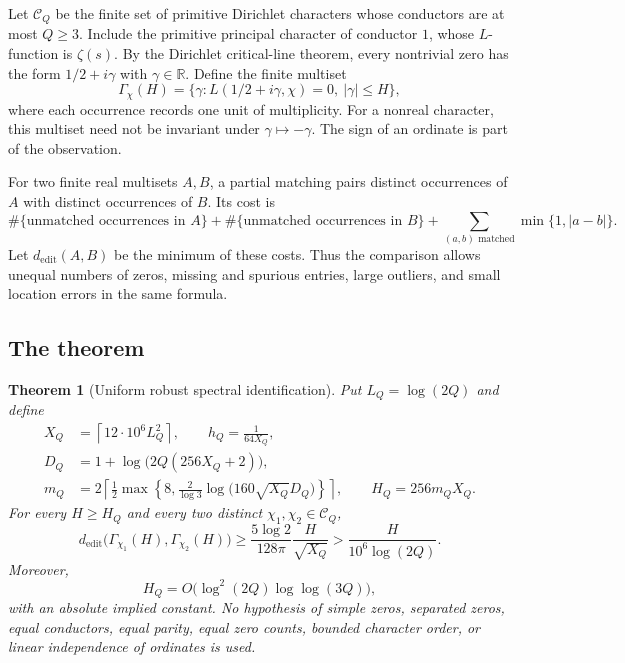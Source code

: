 \documentclass[11pt,letterpaper]{article}
\newtheorem{theorem}{Theorem}[section]
\theoremstyle{definition}\newtheorem{definition}[theorem]{Definition}
\theoremstyle{remark}\newtheorem{remark}[theorem]{Remark}
\newcommand{\edit}{d_{\mathrm{edit}}}
\newcommand{\Ccal}{\mathcal C}
\begin{document}
Let $\Ccal_Q$ be the finite set of primitive Dirichlet characters whose
conductors are at most $Q\ge3$. Include the primitive principal character
of conductor $1$, whose $L$-function is $\zeta(s)$. By the Dirichlet
critical-line theorem, every nontrivial zero has the form
$1/2+i\gamma$ with $\gamma\in\mathbb R$.
Define the finite multiset
\[
 \Gamma_\chi(H)=\{\gamma:L(1/2+i\gamma,\chi)=0,\ |\gamma|\le H\},
\]
where each occurrence records one unit of multiplicity. For a nonreal
character, this multiset need not be invariant under $\gamma\mapsto-\gamma$.
The sign of an ordinate is part of the observation.

For two finite real multisets $A,B$, a partial matching pairs distinct
occurrences of $A$ with distinct occurrences of $B$. Its cost is
\begin{equation}\label{eq:edit-definition}
 \#\{\text{unmatched occurrences in }A\}
 +\#\{\text{unmatched occurrences in }B\}
 +\sum_{(a,b)\text{ matched}}\min\{1,|a-b|\}.
\end{equation}
Let $\edit(A,B)$ be the minimum of these costs. Thus the comparison
allows unequal numbers of zeros, missing and spurious entries, large
outliers, and small location errors in the same formula.

\subsection{The theorem}

\begin{theorem}[Uniform robust spectral identification]\label{thm:main}
Put $L_Q=\log(2Q)$ and define
\begin{align}
 X_Q&=\left\lceil12\cdot10^6 L_Q^2\right\rceil,\qquad
 h_Q=\frac1{64X_Q},\label{eq:parameters1}\\
 D_Q&=1+\log\bigl(2Q(256X_Q+2)\bigr),\nonumber\\
 m_Q&=2\left\lceil\frac12\max\left\{8,
       \frac2{\log3}\log\bigl(160\sqrt{X_Q}D_Q\bigr)\right\}\right\rceil,
       \qquad H_Q=256m_QX_Q.\label{eq:parameters2}
\end{align}
For every $H\ge H_Q$ and every two distinct $\chi_1,\chi_2\in\Ccal_Q$,
\begin{equation}\label{eq:main-bound}
 \boxed{\displaystyle
 \edit\bigl(\Gamma_{\chi_1}(H),\Gamma_{\chi_2}(H)\bigr)
 \ge \frac{5\log2}{128\pi}\frac{H}{\sqrt{X_Q}}
 >\frac{H}{10^6\log(2Q)}.}
\end{equation}
Moreover,
\[
 H_Q=O\bigl(\log^2(2Q)\log\log(3Q)\bigr),
\]
with an absolute implied constant. No hypothesis of simple zeros,
separated zeros, equal conductors, equal parity, equal zero counts,
bounded character order, or linear independence of ordinates is used.
\end{theorem}
\end{document}

